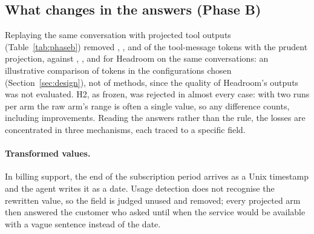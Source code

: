 \subsection{What changes in the answers (Phase B)}

Replaying the same conversation with projected tool outputs (Table~\ref{tab:phaseb}) removed
\PhaseBPrudentTokensi, \PhaseBPrudentTokensiii, \PhaseBPrudentTokensiv{} and \PhaseBPrudentTokensv{} of the
tool-message tokens with the prudent projection, against \PhaseBHeadroomTokensi, \PhaseBHeadroomTokensiii,
\PhaseBHeadroomTokensiv{} and \PhaseBHeadroomTokensv{} for Headroom on the same conversations: an illustrative
comparison of tokens in the configurations chosen (Section~\ref{sec:design}), not of methods, since the quality of
Headroom's outputs was not evaluated. H2, as frozen, was
rejected in almost every case: with two runs per arm the raw arm's range is often a single value, so any difference
counts, including improvements. Reading the answers rather than the rule, the losses are concentrated in three
mechanisms, each traced to a specific field.

\begin{table}[t]
\centering\small
\resizebox{\textwidth}{!}{}
\caption{Phase B: replay of one run per case, only tool messages changed, two runs per arm. \emph{Tool tokens}:
raw size, then change per arm. \emph{Gates}: runs in which every gate passed. \emph{H2}: the relative rule (gates passed in at least as many runs as raw, every thermometer median within
the raw range), on the thermometers as implemented and on the computable part of the protocol's list, without its ``topics covered''
(deviation 15); \emph{meets} says
nothing about absolute quality (content gaps: no raw run passes the gates). $^{\ast}$Also outside the band on the
strict test added after the fact (deviation 11).}
\label{tab:phaseb}
\end{table}

\paragraph{Transformed values.} In billing support, the end of the subscription period arrives as a Unix timestamp
and the agent writes it as a date. Usage detection does not recognise the rewritten value, so the field is judged
unused and removed; every projected arm then answered the customer who asked until when the service would be
available with a vague sentence instead of the date.

